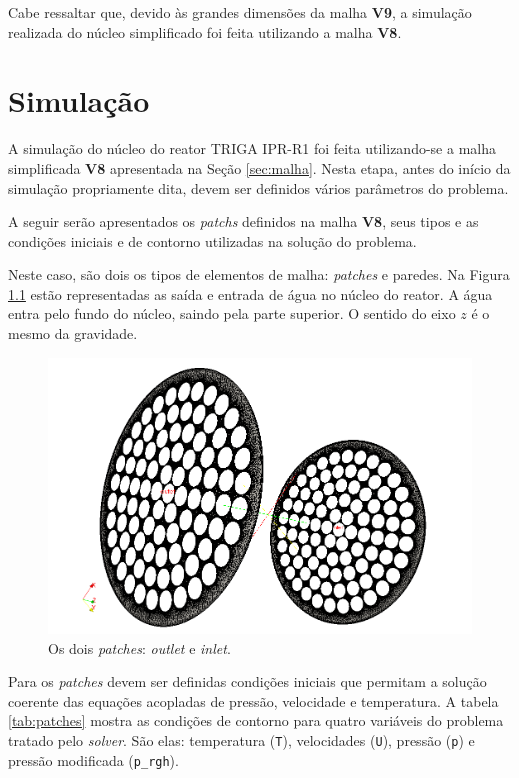 \documentclass[12pt,openright,twoside,a4paper,english,french,spanish,brazil]{abntex2}
\begin{document}
Cabe ressaltar que, devido às grandes dimensões da malha \textbf{V9}, a simulação realizada do núcleo 
simplificado foi feita utilizando a malha \textbf{V8}.

\chapter{Simulação}
\label{sec:simul}

A simulação do núcleo do reator TRIGA IPR-R1 foi feita utilizando-se a malha simplificada \textbf{V8} 
apresentada na Seção \ref{sec:malha}. Nesta etapa, antes do início da simulação propriamente dita, 
devem ser definidos vários parâmetros do problema.

A seguir serão apresentados os \textit{patchs} definidos na malha \textbf{V8}, seus tipos e as condições 
iniciais e de contorno utilizadas na solução do problema.

Neste caso, são dois os tipos de elementos de malha: \textit{patches} e paredes. Na Figura \ref{fig:patches} 
estão representadas as saída e entrada de água no núcleo do reator. A água entra pelo fundo do núcleo, saindo 
pela parte superior. O sentido do eixo $z$ é o mesmo da gravidade.

\begin{figure}[h]
  \centering\includegraphics[scale=0.5]{figuras/patches.png}
  \caption{Os dois \textit{patches}: \textit{outlet} e \textit{inlet}.}
  \label{fig:patches}
\end{figure}

Para os \textit{patches} devem ser definidas condições iniciais que permitam a solução coerente das equações 
acopladas de pressão, velocidade e temperatura. A tabela \ref{tab:patches} mostra as condições de contorno
para quatro variáveis do problema tratado pelo \textit{solver}. São elas: temperatura (\texttt{T}), 
velocidades (\texttt{U}), pressão (\texttt{p}) e pressão modificada (\texttt{p\_rgh}). 
\end{document}
